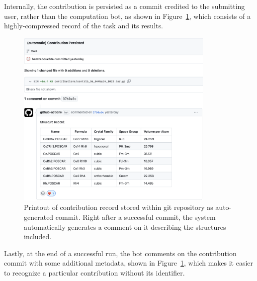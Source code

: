 Internally, the contribution is persisted as a commit credited to the submitting user, rather than the computation bot, as shown in Figure~\ref{mpdd:fig:mpddx4}, which consists of a highly-compressed record of the task and its results.

\begin{figure}[H]
    \centering
    \includegraphics[width=0.85\textwidth]{mpdd/mpddx4.png}
    \caption{Printout of contribution record stored within git repository as auto-generated commit. Right after a successful commit, the system automatically generates a comment on it describing the structures included.}
    \label{mpdd:fig:mpddx4}
\end{figure}

Lastly, at the end of a successful run, the bot comments on the contribution commit with some additional metadata, shown in Figure~\ref{mpdd:fig:mpddx4}, which makes it easier to recognize a particular contribution without its identifier.




\printbibliography[heading=subbibintoc]